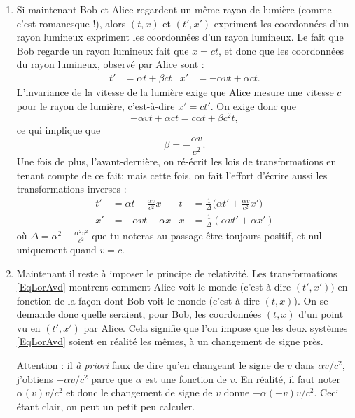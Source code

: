 \begin{enumerate}
	\item Si maintenant Bob et Alice regardent un même rayon de lumière (comme c'est romanesque !), alors \( (t,x)\) et \( (t',x')\) expriment les coordonnées d'un rayon lumineux expriment les coordonnées d'un rayon lumineux. Le fait que Bob regarde un rayon lumineux fait que \( x=ct\), et donc que les coordonnées du rayon lumineux, observé par Alice sont :
	      \begin{align}
		      t' & =\alpha t+\beta ct & x' & =-\alpha v t+\alpha c t.
	      \end{align}
	      L'invariance de la vitesse de la lumière exige que Alice mesure une vitesse \( c\) pour le rayon de lumière, c'est-à-dire \( x'=ct'\). On exige donc que
	      \[
		      -\alpha v t+\alpha ct=c\alpha t+\beta c^2t,
	      \]
	      ce qui implique que
	      \[
		      \beta=-\frac{ \alpha v }{ c^2 }.
	      \]
	      Une fois de plus, l'avant-dernière,  on ré-écrit les lois de transformations en tenant compte de ce fait; mais cette fois, on fait l'effort d'écrire aussi les transformations inverses :
	      \begin{align}	\label{EqLorAvd}
		      t' & =\alpha t-\frac{ \alpha v }{ c^2 }x & t & =\frac{1}{ \Delta }\big( \alpha t'+\frac{ \alpha v }{ c^2 }x' \big) \\
		      x' & =-\alpha vt+\alpha x                & x & =\frac{1}{ \Delta }(\alpha v t'+\alpha x')
	      \end{align}
	      où \( \Delta=\alpha^2-\frac{ \alpha^2 v^2 }{ c^2 }\) que tu noteras au passage être toujours positif, et nul uniquement quand \( v=c\).

	\item Maintenant il reste à imposer le principe de relativité. Les transformations \eqref{EqLorAvd} montrent comment Alice voit le monde (c'est-à-dire \( (t',x'))\) en fonction de la façon dont Bob voit le monde (c'est-à-dire \( (t,x)\)). On se demande donc quelle seraient, pour Bob, les coordonnées \( (t,x)\) d'un point vu en \( (t',x')\) par Alice. Cela signifie que l'on impose que les deux systèmes \eqref{EqLorAvd} soient en réalité les mêmes, à un changement de signe près.

	      Attention : il \emph{à priori} faux de dire qu'en changeant le signe de \( v\) dans \( \alpha v/c^2\), j'obtiens \( -\alpha v/c^2\) parce que \( \alpha\) est une fonction de \( v\). En réalité, il faut noter \( \alpha(v)v/c^2\) et donc le changement de signe de \( v\) donne \( -\alpha(-v)v/c^2\). Ceci étant clair, on peut un petit peu calculer.


\end{enumerate}
